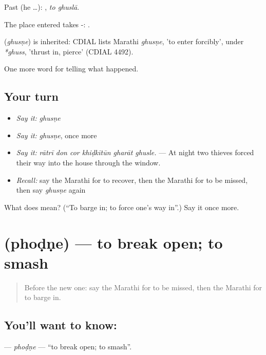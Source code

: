 Past (he …):  , \emph{to ghuslā}.

The place entered takes -:  .

\begin{cousinweb}
\textbf{} (\emph{ghusṇe}) is inherited: CDIAL lists Marathi \emph{ghusṇe}, 'to enter forcibly', under \emph{*ghuss}, 'thrust in, pierce' (CDIAL 4492).
\end{cousinweb}

\begin{grammarlens}[title={What you've built}]
One more word for telling what happened.
\end{grammarlens}

\subsection*{Your turn}
\begin{itemize}
\raggedright
  \item \emph{Say it:} \emph{ghusṇe}
  \item \emph{Say it:} \emph{ghusṇe}, once more
  \item \emph{Say it:} \emph{rātrī don cor khiḍkītūn gharāt ghusle.} — At night two thieves forced their way into the house through the window.
  \item \emph{Recall:} say the Marathi for to recover, then the Marathi for to be missed, then say \emph{ghusṇe} again
\end{itemize}

\begin{tcolorbox}[breakable,colback=teal!4,colframe=teal!35!black,title={Before you move on}]
What does  mean? (\textquotedblleft{}To barge in; to force one's way in\textquotedblright{}.) Say it once more.
\end{tcolorbox}
\section[\texorpdfstring{\mr{फोडणे} (phoḍṇe)}{फोडणे (phoḍṇe)}]{ (phoḍṇe) — to break open; to smash}

\label{lesson:MR-C297-phodne}



\begin{quote}
Before the new one: say the Marathi for to be missed, then the Marathi for to barge in.
\end{quote}

\subsection*{You'll want to know: }
\textbf{} — \emph{phoḍṇe} — \textquotedblleft{}to break open; to smash\textquotedblright{}.

